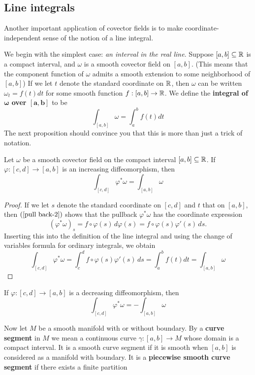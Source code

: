 \subsection{Line integrals}
Another important application of covector fields is to make coordinate-independent sense of the notion of a line integral.\par
We begin with the simplest case: \textit{an interval in the real line}. Suppose $[a,b]\subseteq\mathbb{R}$ is a compact interval, and $\omega$ is a smooth covector field on $[a,b]$. (This means that the component function of $\omega$ admits a smooth extension to some neighborhood of $[a,b]$) If we let $t$ denote the standard coordinate on $\mathbb{R}$, then $\omega$ can be written $\omega_t=f(t)dt$ for some smooth function $f:[a,b]\to\mathbb{R}$. We define the \textbf{integral of $\bm{\omega}$ over $\bm{[a,b]}$} to be
\[\int_{[a,b]}\omega=\int_{a}^{b}f(t)dt\]
The next proposition should convince you that this is more than just a trick of
notation.
\begin{proposition}\label{diffeo invariance integral}
Let $\omega$ be a smooth covector field on the compact interval $[a,b]\subseteq\mathbb{R}$. If $\varphi:[c,d]\to[a,b]$ is an increasing diffeomorphism, then
\[\int_{[c,d]}\varphi^*\omega=\int_{[a,b]}\omega\]
\end{proposition}
\begin{proof}
If we let $s$ denote the standard coordinate on $[c,d]$ and $t$ that on $[a,b]$, then $(\ref{pull back-2})$ shows that the pullback $\varphi^*\omega$ has the coordinate expression 
\[(\varphi^*\omega)_s=f\circ\varphi(s)\,d\varphi(s)=f\circ\varphi(s)\varphi'(s)\,ds.\] 
Inserting this into the definition of the line integral and using the
change of variables formula for ordinary integrals, we obtain
\[\int_{[c,d]}\varphi^*\omega=\int_{c}^{d}f\circ\varphi(s)\varphi'(s)\,ds=\int_{a}^{b}f(t)dt=\int_{[a,b]}\omega\]
\end{proof}
\begin{remark}\label{diffeo invariance remk}
If $\varphi:[c,d]\to[a,b]$ is a decreasing diffeomorphism, then
\[\int_{[c,d]}\varphi^*\omega=-\int_{[a,b]}\omega\]
\end{remark}
Now let $M$ be a smooth manifold with or without boundary. By a \textbf{curve segment} in $M$ we mean a continuous curve $\gamma:[a,b]\to M$ whose domain is a compact interval. It is a smooth curve segment if it is smooth when $[a,b]$ is considered as a manifold with boundary. It is a \textbf{piecewise smooth curve segment} if there exists a finite partition 
